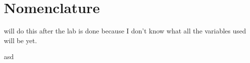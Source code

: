 \section*{Nomenclature}  
will do this after the lab is done because I don't know what all the variables used will be yet.

asd